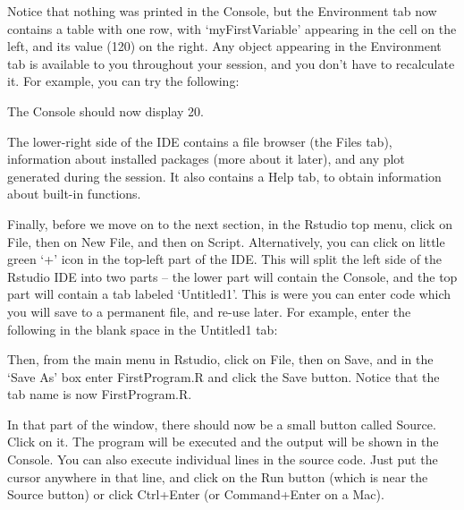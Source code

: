 Notice that nothing was printed in the Console, but the Environment tab now contains a table with one row, with `myFirstVariable' appearing in the cell on the left, and its value (120) on the right. Any object appearing in the Environment tab is available to you throughout your \R session, and you don't have to recalculate it. For example, you can try the following:

\begin{Shaded}
\begin{Highlighting}[]
\SpecialCharTok{/}
\end{Highlighting}
\end{Shaded}

The Console should now display 20.

The lower-right side of the IDE contains a file browser (the Files tab), information about installed packages (more about it later), and any plot generated during the \R session. It also contains a Help tab, to obtain information about built-in functions.

Finally, before we move on to the next section, in the Rstudio top menu, click on File, then on New File, and then on \R Script. Alternatively, you can click on little green `+' icon in the top-left part of the IDE. This will split the left side of the Rstudio IDE into two parts -- the lower part will contain the Console, and the top part will contain a tab labeled `Untitled1'. This is were you can enter \R code which you will save to a permanent file, and re-use later.
For example, enter the following in the blank space in the Untitled1 tab:

\begin{Shaded}
\begin{Highlighting}[]
\NormalTok{(}\StringTok{\textquotesingle{}}\NormalTok{)}
\end{Highlighting}
\end{Shaded}

Then, from the main menu in Rstudio, click on File, then on Save, and in the `Save As' box enter FirstProgram.R and click the Save button.
Notice that the tab name is now FirstProgram.R.

In that part of the window, there should now be a small button called Source. Click on it. The program will be executed and the output will be shown in the Console. You can also execute individual lines in the source code. Just put the cursor anywhere in that line, and click on the Run button (which is near the Source button) or click Ctrl+Enter (or Command+Enter on a Mac). 

